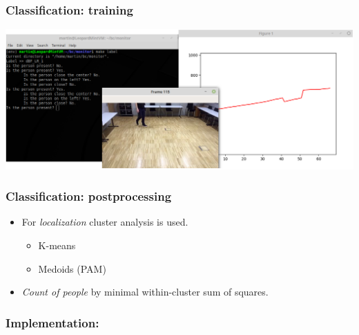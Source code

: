 \documentclass[10pt,xcolor=pdflatex]{beamer}
\begin{document}
\begin{frame}\frametitle{Classification: training}
    \begin{center}
        \includegraphics[width=1\textwidth]{img/labelling.png}
    \end{center}
\end{frame}

\begin{frame}\frametitle{Classification: postprocessing}
    \begin{itemize}
        \item For \emph{localization} cluster analysis is used.
            \begin{itemize}
                \item K-means
                \item Medoids (PAM)
            \end{itemize}
        \item \emph{Count of people} by minimal within-cluster sum of squares.
    \end{itemize}
\end{frame}

\begin{frame}\frametitle{Implementation:}
\end{frame}


\end{document}
